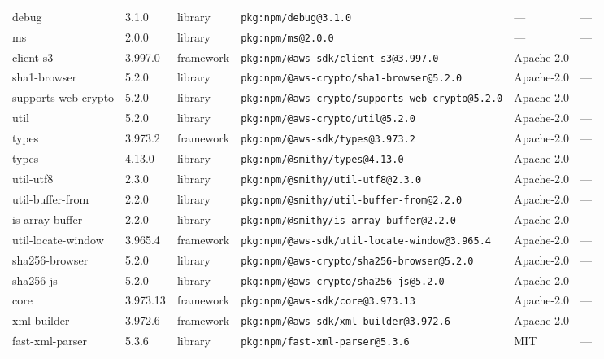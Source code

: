 \documentclass[11pt,a4paper]{article}
\begin{document}
\begin{longtable}{|p{4cm}|p{2cm}|p{1.6cm}|p{5cm}|p{1.5cm}|p{3.5cm}|}
\raggedright debug & 3.1.0 & library & \small\texttt{pkg:npm/debug@3.1.0} & — & \small — \\
\raggedright ms & 2.0.0 & library & \small\texttt{pkg:npm/ms@2.0.0} & — & \small — \\
\raggedright client-s3 & 3.997.0 & framework & \small\texttt{pkg:npm/@aws-sdk/client-s3@3.997.0} & Apache-2.0 & \small — \\
\raggedright sha1-browser & 5.2.0 & library & \small\texttt{pkg:npm/@aws-crypto/sha1-browser@5.2.0} & Apache-2.0 & \small — \\
\raggedright supports-web-crypto & 5.2.0 & library & \small\texttt{pkg:npm/@aws-crypto/supports-web-crypto@5.2.0} & Apache-2.0 & \small — \\
\raggedright util & 5.2.0 & library & \small\texttt{pkg:npm/@aws-crypto/util@5.2.0} & Apache-2.0 & \small — \\
\raggedright types & 3.973.2 & framework & \small\texttt{pkg:npm/@aws-sdk/types@3.973.2} & Apache-2.0 & \small — \\
\raggedright types & 4.13.0 & library & \small\texttt{pkg:npm/@smithy/types@4.13.0} & Apache-2.0 & \small — \\
\raggedright util-utf8 & 2.3.0 & library & \small\texttt{pkg:npm/@smithy/util-utf8@2.3.0} & Apache-2.0 & \small — \\
\raggedright util-buffer-from & 2.2.0 & library & \small\texttt{pkg:npm/@smithy/util-buffer-from@2.2.0} & Apache-2.0 & \small — \\
\raggedright is-array-buffer & 2.2.0 & library & \small\texttt{pkg:npm/@smithy/is-array-buffer@2.2.0} & Apache-2.0 & \small — \\
\raggedright util-locate-window & 3.965.4 & framework & \small\texttt{pkg:npm/@aws-sdk/util-locate-window@3.965.4} & Apache-2.0 & \small — \\
\raggedright sha256-browser & 5.2.0 & library & \small\texttt{pkg:npm/@aws-crypto/sha256-browser@5.2.0} & Apache-2.0 & \small — \\
\raggedright sha256-js & 5.2.0 & library & \small\texttt{pkg:npm/@aws-crypto/sha256-js@5.2.0} & Apache-2.0 & \small — \\
\raggedright core & 3.973.13 & framework & \small\texttt{pkg:npm/@aws-sdk/core@3.973.13} & Apache-2.0 & \small — \\
\raggedright xml-builder & 3.972.6 & framework & \small\texttt{pkg:npm/@aws-sdk/xml-builder@3.972.6} & Apache-2.0 & \small — \\
\raggedright fast-xml-parser & 5.3.6 & library & \small\texttt{pkg:npm/fast-xml-parser@5.3.6} & MIT & \small — \\

\end{longtable}
\end{document}
